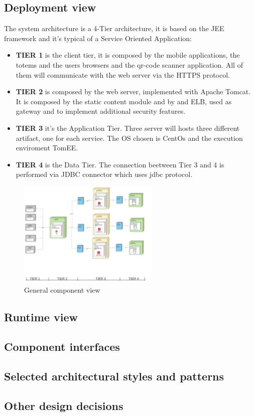 \subsection{Deployment view}
\label{subsect:deploymentview}
The system architecture is a 4-Tier architecture, it is based on the JEE framework and it's typical of a Service Oriented Application:
\begin{itemize}
    \item \textbf{TIER 1} is the client tier, it is composed by the mobile applications, the totems and the users browsers and the qr-code scanner application. All of them will communicate with the web server via the HTTPS protocol.
    \item \textbf{TIER 2} is composed by the web server, implemented with Apache Tomcat. It is composed by the static content module and by and ELB, used as gateway and to implement additional security features.
    \item \textbf{TIER 3} it's the Application Tier. Three server will hosts three different artifact, one for each service. The OS chosen is CentOs and the execution enviroment TomEE.
    \item \textbf{TIER 4} is the Data Tier. The connection beetween Tier 3 and 4 is performed via JDBC connector which uses jdbc protocol.
\end{itemize}
\begin{figure}[h!]
    \centering
    \includegraphics[width=0.6\textwidth]{Images/Deployement View.png}
    \caption{\label{fig:Deployement View}{General component view}}
\end{figure}

\subsection{Runtime view}
\label{subsect:runtimeview}

\subsection{Component interfaces}
\label{subsect:componentinterfaces}

\subsection{Selected architectural styles and patterns}
\label{subsect:selectedarchitecturalstylesandpatterns}

\subsection{Other design decisions}
\label{subsect:otherdesigndecisions}


